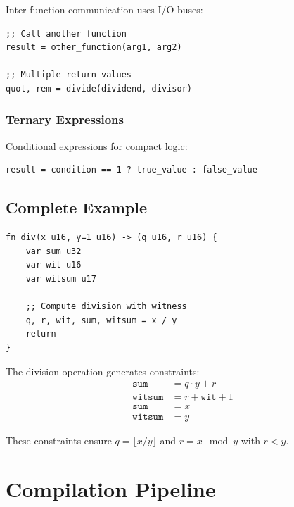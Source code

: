 \documentclass[11pt,a4paper]{article}
\begin{document}
Inter-function communication uses I/O buses:

\begin{lstlisting}[style=zkasm,caption={Function Call Example}]
;; Call another function
result = other_function(arg1, arg2)

;; Multiple return values
quot, rem = divide(dividend, divisor)
\end{lstlisting}

\subsubsection{Ternary Expressions}

Conditional expressions for compact logic:

\begin{lstlisting}[style=zkasm,caption={Ternary Expression}]
result = condition == 1 ? true_value : false_value
\end{lstlisting}

\subsection{Complete Example}

\begin{lstlisting}[style=zkasm,caption={Division Function Implementation}]
fn div(x u16, y=1 u16) -> (q u16, r u16) {
    var sum u32
    var wit u16
    var witsum u17

    ;; Compute division with witness
    q, r, wit, sum, witsum = x / y
    return
}
\end{lstlisting}

The division operation generates constraints:
\begin{align}
\texttt{sum} &= q \cdot y + r \\
\texttt{witsum} &= r + \texttt{wit} + 1 \\
\texttt{sum} &= x \\
\texttt{witsum} &= y
\end{align}

These constraints ensure $q = \lfloor x/y \rfloor$ and $r = x \mod y$ with $r < y$.

\section{Compilation Pipeline}
\end{document}
